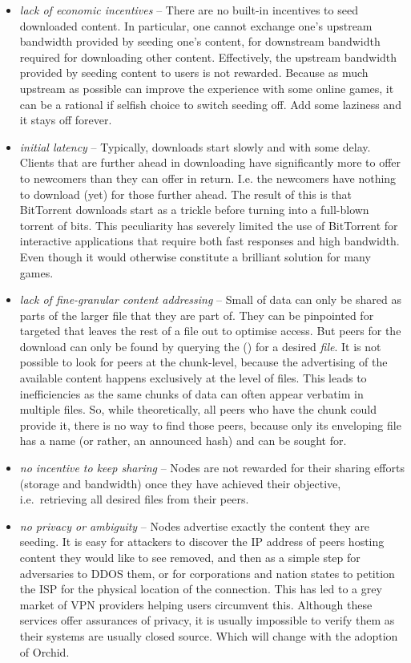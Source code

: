 \begin{itemize}
\item \emph{lack of economic incentives} -- 
There are no built-in incentives to seed downloaded content. In particular, one cannot exchange one's upstream bandwidth provided by seeding one's content, for downstream bandwidth required for downloading other content. Effectively, the upstream bandwidth provided by seeding content to users is not rewarded. Because as much upstream as possible can improve the experience with some online games, it can be a rational if selfish choice to switch seeding off. Add some laziness and it stays off forever.

\item \emph{initial latency} -- 
 Typically, downloads start slowly and with some delay. Clients that are further ahead in downloading have significantly more to offer to newcomers than they can offer in return. I.e. the newcomers have nothing to download (yet) for those further ahead. The result of this is that BitTorrent downloads start as a trickle before turning into a full-blown torrent of bits. This peculiarity has severely limited the use of BitTorrent for interactive applications that require both fast responses and high bandwidth. Even though it would otherwise constitute a brilliant solution for many games.
 
\item \emph{lack of fine-granular content addressing} -- Small  of data can only be shared as parts of the larger file that they are part of. They can be pinpointed for targeted that leaves the rest of a file out to optimise access. But peers for the download can only be found by  querying the  () for a desired \emph{file}. It is not possible to look for peers at the chunk-level, because the advertising of the available content happens exclusively at the level of files. This leads to inefficiencies as the same chunks of data can often appear verbatim in multiple files. So, while theoretically, all peers who have the chunk could provide it, there is no way to find those peers, because only its enveloping file has a name (or rather, an announced hash) and can be sought for.

\item \emph{no incentive to keep sharing} --
Nodes are not rewarded for their sharing efforts (storage and bandwidth) once they have achieved their objective, i.e.\ retrieving all desired files from their peers.

\item \emph{no privacy or ambiguity} --
Nodes advertise exactly the content they are seeding. It is easy for attackers to discover the IP address of peers hosting content they would like to see removed, and then as a simple step for adversaries to DDOS them, or for corporations and nation states to petition the ISP for the physical location of the connection. This has led to a grey market of VPN providers helping users circumvent this. Although these services offer assurances of privacy, it is usually impossible to verify them as their systems  are usually closed source. Which will change with the adoption of Orchid.
\end{itemize}

